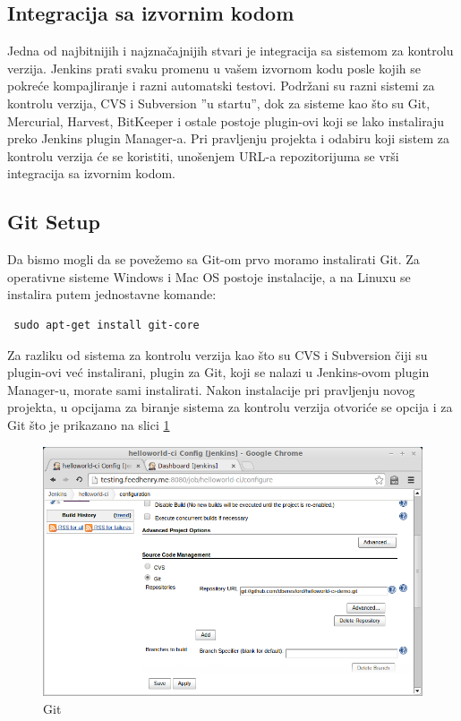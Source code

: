 \subsection{Integracija sa izvornim kodom}

Jedna od najbitnijih i najznačajnijih stvari je integracija sa sistemom za kontrolu verzija. Jenkins prati svaku promenu u vašem izvornom kodu posle kojih se pokreće kompajliranje i razni automatski testovi. Podržani su razni sistemi za kontrolu verzija, CVS i Subversion ''u startu'', dok za sisteme kao što su Git, Mercurial, Harvest, BitKeeper i ostale postoje plugin-ovi koji se lako instaliraju preko Jenkins plugin Manager-a. Pri pravljenju projekta i odabiru koji sistem za kontrolu verzija će se koristiti, unošenjem URL-a repozitorijuma se vrši integracija sa izvornim kodom.

\subsection{Git Setup}

Da bismo mogli da se povežemo sa Git-om prvo moramo instalirati Git. Za operativne sisteme Windows i Mac OS postoje instalacije, a na Linuxu se instalira putem jednostavne komande:

\begin{verbatim}
 sudo apt-get install git-core
\end{verbatim}

Za razliku od sistema za kontrolu verzija kao što su CVS i Subversion čiji su plugin-ovi već instalirani, plugin za Git, koji se nalazi u Jenkins-ovom plugin Manager-u, morate sami instalirati. Nakon instalacije pri pravljenju novog projekta, u opcijama za biranje sistema za kontrolu verzija otvoriće se opcija i za Git što je prikazano na slici \ref{fig:git}

\begin{figure}[h!]
\begin{center}
\includegraphics[scale=0.75, totalheight=0.4\textheight]{slike/git_jenkins.jpg}
\end{center}
\caption{Git}
\label{fig:git}
\end{figure}


